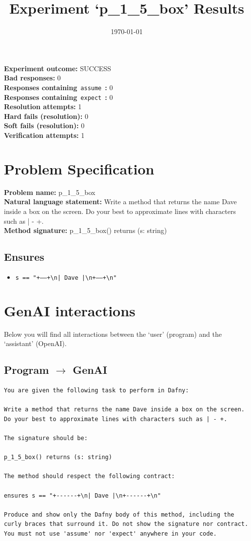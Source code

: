 \documentclass{article}
\begin{document}
\title{Experiment `p\_1\_5\_box' Results}
\author{\today}
\date{}
\maketitle
\textbf{Experiment outcome: }SUCCESS
\\\textbf{Bad responses: }0
\\\textbf{Responses containing}~\texttt{assume}~\textbf{: }0
\\\textbf{Responses containing}~\texttt{expect}~\textbf{: }0
\\\textbf{Resolution attempts: }1
\\\textbf{Hard fails (resolution): }0
\\\textbf{Soft fails (resolution): }0
\\\textbf{Verification attempts: }1
\section*{Problem Specification}
\textbf{Problem name: }p\_1\_5\_box
\\\textbf{Natural language statement: }Write a method that returns the name Dave inside a box on the screen. Do your best to approximate lines with characters such as | - +.
\\\textbf{Method signature: }p\_1\_5\_box() returns (s: string)
\subsection*{Ensures}
\begin{itemize}
\item \texttt{s == "+------+\textbackslash{}n| Dave |\textbackslash{}n+------+\textbackslash{}n"}
\end{itemize}
\clearpage
\section*{GenAI interactions}
Below you will find all interactions between the `user' (program) and the `assistant' (OpenAI).
\subsection*{Program $\rightarrow$ GenAI}
\begin{lstlisting}
You are given the following task to perform in Dafny:

Write a method that returns the name Dave inside a box on the screen. Do your best to approximate lines with characters such as | - +.

The signature should be:

p_1_5_box() returns (s: string)

The method should respect the following contract:

ensures s == "+------+\n| Dave |\n+------+\n"

Produce and show only the Dafny body of this method, including the curly braces that surround it. Do not show the signature nor contract. You must not use 'assume' nor 'expect' anywhere in your code.
\end{lstlisting}
\end{document}

